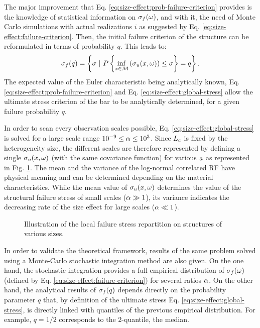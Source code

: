 \documentclass[12pt]{article}
\begin{document}
The major improvement that Eq. \ref{eq:size-effect:prob-failure-criterion} provides is the knowledge of statistical information on $\sigma_f(\omega)$, and with it, the need of Monte Carlo simulations with actual realizations $i$ as suggested by Eq. \ref{eq:size-effect:failure-criterion}. Then, the initial failure criterion of the structure can be reformulated in terms of probability $q$. This leads to:
\begin{equation}
	\label{eq:size-effect:global-stress}
	\sigma_f(q) = \left\{ \sigma \ | \ P\left\{ \underset{x\in \mathcal{M}}{\inf}\left( \sigma_u(x,\omega) \right) \leq \sigma \right\} = q \right\}.
\end{equation}
The expected value of the Euler characteristic being analytically known, Eq. \ref{eq:size-effect:prob-failure-criterion} and Eq. \ref{eq:size-effect:global-stress} allow the ultimate stress criterion of the bar to be analytically determined, for a given failure probability $q$.
\par In order to scan every observation scales possible, Eq. \ref{eq:size-effect:global-stress} is solved for a large scale range $10^{-9}\le\alpha\le10^3$. Since $L_c$ is fixed by the heterogeneity size, the different scales are therefore represented by defining a single $\sigma_u(x,\omega)$ (with the same covariance function) for various $a$ as represented in Fig. \ref{fig:size-effect:1D-various-sizes}. The mean and the variance of the log-normal correlated RF have physical meaning and can be determined depending on the material characteristics. While the mean value of $\sigma_u(x,\omega)$ determines the value of the structural failure stress of small scales ($\alpha\gg1$), its variance indicates the decreasing rate of the size effect for large scales ($\alpha\ll1$).
\begin{figure}[h!]
  \centering
  \scalebox{0.55}{\LARGE}
  \caption{Illustration of the local failure stress repartition on structures of various sizes.\label{fig:size-effect:1D-various-sizes}}
\end{figure}
\par In order to validate the theoretical framework, results of the same problem solved using a Monte-Carlo stochastic integration method are also given. On the one hand, the stochastic integration provides a full empirical distribution of $\sigma_f(\omega)$ (defined by Eq. \ref{eq:size-effect:failure-criterion}) for several ratios $\alpha$. On the other hand, the analytical results of $\sigma_f(q)$ depends directly on the probability parameter $q$ that, by definition of the ultimate stress Eq. \ref{eq:size-effect:global-stress}, is directly linked with quantiles of the previous empirical distribution. For example, $q=1/2$ corresponds to the $2$-quantile, \ie the median.
\end{document}
